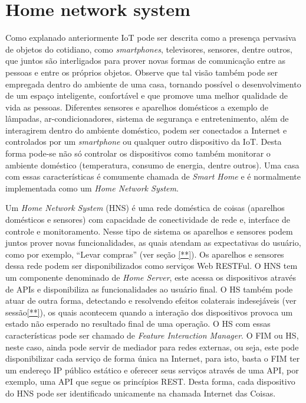 \section{Home network system}
\label{sec:hns}
Como explanado anteriormente IoT pode ser descrita como a presença pervasiva de objetos do cotidiano, como \textit{smartphones}, televisores, sensores, dentre outros, que juntos são interligados para prover novas formas de comunicação entre as pessoas e entre os próprios objetos. Observe que tal visão também pode ser empregada dentro do ambiente de uma casa, tornando possível o desenvolvimento de um espaço inteligente, confortável e que promove uma melhor qualidade de vida as pessoas. Diferentes sensores e aparelhos domésticos a exemplo de lâmpadas, ar-condicionadores, sistema de segurança e entretenimento, além de interagirem dentro do ambiente doméstico, podem ser conectados a Internet e controlados por um \textit{smartphone} ou qualquer outro dispositivo da IoT. Desta forma pode-se não só controlar os dispositivos como também monitorar o ambiente doméstico (temperatura, consumo de energia, dentre outros). Uma casa com essas características é comumente chamada de \textit{Smart Home} e é normalmente implementada como um \textit{Home Network System}.\cite{Piyare:2013}

Um \textit{Home Network System} (HNS) é uma rede doméstica de coisas     (aparelhos domésticos e sensores) com capacidade de conectividade de rede e, interface de controle e monitoramento. Nesse tipo de sistema os aparelhos e sensores podem juntos prover novas funcionalidades, as quais atendam as expectativas do usuário, como por exemplo, ``Levar compras'' (ver seção \ref{**}). Os aparelhos e sensores dessa rede podem ser disponibilizados como serviços Web RESTFul. O HNS tem um componente denominado de \textit{Home Server}, este acessa os dispositivos através de APIs e disponibiliza as funcionalidades ao usuário final. O HS também pode atuar de outra forma, detectando e resolvendo efeitos colaterais indesejáveis (ver sessão\ref{**}), os quais acontecem quando a interação dos dispositivos provoca um estado não esperado no resultado final de uma operação. O HS com essas características pode ser chamado de \textit{Feature Interaction Manager}. O FIM ou HS, neste caso, ainda pode servir de mediador para redes externas, ou seja, este pode disponibilizar cada serviço de forma única na Internet, para isto, basta o FIM ter um endereço IP público estático e oferecer seus serviços através de uma API, por exemplo, uma API que segue os princípios REST. Desta forma, cada dispositivo do HNS pode ser identificado unicamente na chamada Internet das Coisas. \cite{Nakamura:2009}\cite{Ikegami:2013}

